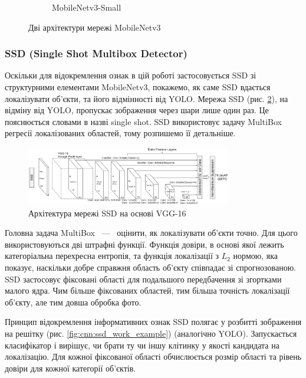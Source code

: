 \begin{figure}[H]
\begin{subfigure}[c]{0.4\textwidth}
        \caption{MobileNetv3-Small
        }
    \end{subfigure}
    \caption{Дві архітектури мережі MobileNetv3 \cite{mobilenetv3}
        \label{fig:cnn:mobilenetv3_architecture}
    }
\end{figure}

\subsubsection{SSD (Single Shot Multibox Detector)}

Оскільки для відокремлення ознак в цій роботі застосовується SSD зі
структурними елементами MobileNetv3, покажемо, як саме SSD вдається
локалізувати об'єкти, та його відмінності від YOLO.
Мережа SSD (рис. \ref{fig:cnn:ssd_architecture}), на відміну від YOLO, пропускає зображення
через шари лише один раз. Це пояснюється словами в назві single shot.
SSD використовує задачу MultiBox регресії локалізованих областей, тому розпишемо її детальніше.
\begin{figure}[H]
    \centering
    \includegraphics[width=0.8\textwidth]{images/cnn_ssd_architecture}
    \caption{Архітектура мережі SSD на основі VGG-16    \cite{ssd}
        \label{fig:cnn:ssd_architecture}
    }
\end{figure}
Головна задача MultiBox ~---~ оцінити, як локалізувати об'єкти точно. Для цього використовуються
дві штрафні функції. Функція довіри, в основі якої лежить категоріальна перехресна ентропія, та
функція локалізації з $L_2$ нормою, яка показує, наскільки добре справжня область об'єкту співпадає
зі спрогнозованою.
SSD застосовує фіксовані області для подальшого передбачення
зі згортками малого ядра.
Чим більше фіксованих областей, тим більша точність локалізації об'єкту,
але тим довша обробка фото.

Принцип відокремлення інформативних ознак SSD полягає у розбитті зображення на решітку
(рис. \ref{fig:cnn:ssd_work_example}) (аналогічно YOLO). Запускається класифікатор
і вирішує, чи брати ту чи іншу клітинку у якості кандидата на локалізацію.
Для кожної фіксованої області обчислюється розмір
області та рівень довіри для кожної категорії об'єктів.

